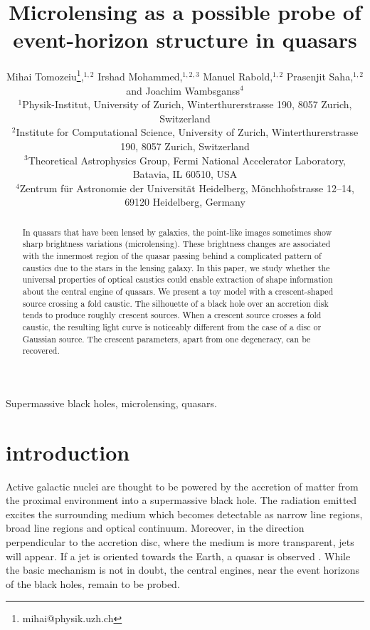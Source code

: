 \documentclass[usenatbib]{mn2e}
\title{Microlensing as a possible probe of event-horizon structure in quasars}
\author[Tomozeiu et al]{Mihai Tomozeiu\thanks{mihai@physik.uzh.ch},$^{1,2}$ 
Irshad Mohammed,$^{1,2,3}$ 
Manuel Rabold,$^{1,2}$
Prasenjit Saha,$^{1,2}$  
\newauthor
and Joachim Wambsganss$^4$\\
$^1${Physik-Institut, University of Zurich, Winterthurerstrasse 190,
  8057 Zurich, Switzerland} \\
$^2${Institute for Computational Science, University of Zurich,
  Winterthurerstrasse 190, 8057 Zurich, Switzerland} \\
$^3${Theoretical Astrophysics Group, Fermi National Accelerator Laboratory, Batavia, IL 60510, USA}\\
$^4${Zentrum f\"ur Astronomie der Universit\"at Heidelberg,
  M\"onchhofstrasse 12--14, 69120 Heidelberg, Germany}
}
\begin{document}
\maketitle

\begin{abstract}

In quasars that have been lensed by galaxies, the point-like images
sometimes show sharp brightness variations (microlensing).  These
brightness changes are associated with the innermost region of the
quasar passing behind a complicated pattern of caustics due to the
stars in the lensing galaxy.  In this paper, we study whether the
universal properties of optical caustics could enable extraction of
shape information about the central engine of quasars.  We present a
toy model with a crescent-shaped source crossing a fold caustic.  The
silhouette of a black hole over an accretion disk tends to produce
roughly crescent sources.  When a crescent source crosses a fold
caustic, the resulting light curve is noticeably different from the
case of a disc or Gaussian source.  The crescent parameters, apart
from one degeneracy, can be recovered.
\end{abstract}


\begin{keywords}
Supermassive black holes, microlensing, quasars.
\end{keywords}

\section{introduction}

Active galactic nuclei are thought to be powered by the
accretion of matter from the proximal environment into a supermassive
black hole.  The radiation emitted excites the surrounding medium
which becomes detectable as narrow line regions, broad line regions
and optical continuum.  Moreover, in the direction perpendicular to
the accretion disc, where the medium is more transparent, jets will
appear.  If a jet is oriented towards the Earth, a quasar is observed
\citep[e.g.,][]{1984RvMP...56..255B}.  While the basic mechanism
\citep[originating in the work
  of][]{1964ApJ...140..796S,1964SPhD....9..246Z,1969Natur.223..690L}
is not in doubt, the central engines, near the event horizons of the
black holes, remain to be probed.
\end{document}
